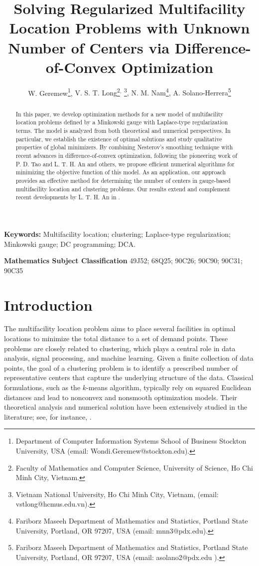 \documentclass[11pt]{article}
\title{Solving Regularized Multifacility Location Problems with Unknown Number of Centers via Difference-of-Convex Optimization}
\author{{ W. Geremew}\footnote{ Department of Computer Information Systems
School of Business
Stockton University, USA (email: Wondi.Geremew@stockton.edu).},
{ V. S. T. Long\footnote{Faculty of Mathematics and Computer
Science, University of Science,
Ho Chi Minh City, Vietnam.}$^,$ \footnote{Vietnam National University, Ho Chi Minh City, Vietnam, (email: vstlong@hcmus.edu.vn).},
{ N. M. Nam}\footnote{Fariborz Maseeh Department of Mathematics and Statistics,
Portland State University, Portland, OR 97207, USA (email: mnn3@pdx.edu). }, { A. Solano-Herrera}\footnote{Fariborz Maseeh Department of Mathematics and Statistics, Portland State University, Portland, OR
97207, USA (email: asolano2@pdx.edu ).}}}
\date{}
\theoremstyle{definition}
\newcommand{\1}{\mathbf{1}}
\begin{document}
\maketitle


\begin{abstract} In this paper, we develop optimization methods for a new model of multifacility location problems  defined by a Minkowski gauge with Laplace-type regularization terms. The model is analyzed from both theoretical and numerical perspectives. In particular, we establish the existence of optimal solutions and study qualitative properties of global minimizers. By combining Nesterov’s smoothing technique with recent advances in difference-of-convex optimization, following the pioneering work of P. D. Tao and L. T. H. An and others, we propose efficient numerical algorithms for minimizing the objective function of this model. As an application, our approach provides an effective method for determining the number of centers in gauge-based multifacility location and clustering problems. Our results extend and complement recent developments by L. T. H. An in \cite{An2025}.


\end{abstract}


\noindent \textbf{Keywords:} Multifacility location; clustering; Laplace-type regularization;  Minkowski gauge; DC programming;  DCA.

\noindent \textbf{Mathematics Subject Classification} 49J52; 68Q25; 90C26; 90C90; 90C31; 90C35
\section{Introduction}

The multifacility location problem aims to place several facilities in optimal locations to minimize the total distance to a set of demand points. These problems are closely related to clustering, which plays a central role in data analysis, signal processing, and machine learning. Given a finite collection of data points, the goal of a clustering problem is to identify a prescribed number of representative centers that capture the underlying structure of the data. Classical formulations, such as the $k$-means algorithm, typically rely on squared Euclidean distances and lead to nonconvex and nonsmooth optimization models. Their theoretical analysis and numerical solution have been extensively studied in the literature; see, for instance, \cite{Cuong2020, Cuong2023, CTWYOptim, LNSYkcenter, Martini2002, Mordukhovich2010, Nam2018}. 
\end{document}
